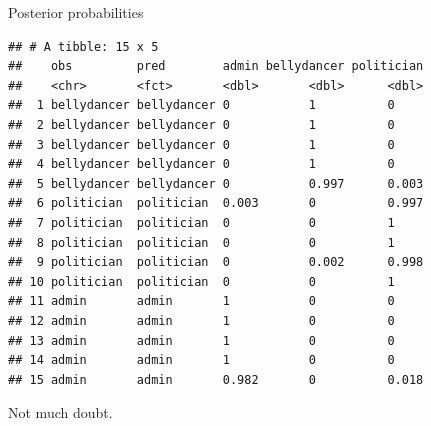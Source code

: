 \documentclass[
  ignorenonframetext,
]{beamer}
\newenvironment{Shaded}{\begin{snugshade}}{\end{snugshade}}
\newcommand{\DataTypeTok}[1]{\textcolor[rgb]{0.13,0.29,0.53}{#1}}
\newcommand{\DecValTok}[1]{\textcolor[rgb]{0.00,0.00,0.81}{#1}}
\newcommand{\KeywordTok}[1]{\textcolor[rgb]{0.13,0.29,0.53}{\textbf{#1}}}
\newcommand{\NormalTok}[1]{#1}
\newcommand{\OperatorTok}[1]{\textcolor[rgb]{0.81,0.36,0.00}{\textbf{#1}}}
\newcommand{\StringTok}[1]{\textcolor[rgb]{0.31,0.60,0.02}{#1}}
\begin{document}
\begin{frame}[fragile]{Posterior probabilities}
\protect\hypertarget{posterior-probabilities-3}{}

\scriptsize

\begin{Shaded}
\end{Shaded}

\begin{verbatim}
## # A tibble: 15 x 5
##    obs         pred        admin bellydancer politician
##    <chr>       <fct>       <dbl>       <dbl>      <dbl>
##  1 bellydancer bellydancer 0           1          0    
##  2 bellydancer bellydancer 0           1          0    
##  3 bellydancer bellydancer 0           1          0    
##  4 bellydancer bellydancer 0           1          0    
##  5 bellydancer bellydancer 0           0.997      0.003
##  6 politician  politician  0.003       0          0.997
##  7 politician  politician  0           0          1    
##  8 politician  politician  0           0          1    
##  9 politician  politician  0           0.002      0.998
## 10 politician  politician  0           0          1    
## 11 admin       admin       1           0          0    
## 12 admin       admin       1           0          0    
## 13 admin       admin       1           0          0    
## 14 admin       admin       1           0          0    
## 15 admin       admin       0.982       0          0.018
\end{verbatim}

\normalsize

Not much doubt.

\end{frame}
\end{document}

